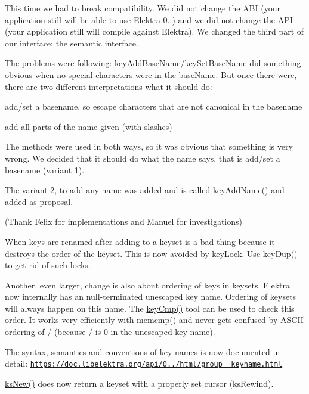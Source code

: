 This time we had to break compatibility. We did not change the A\+BI (your application still will be able to use Elektra 0..) and we did not change the A\+PI (your application still will compile against Elektra). We changed the third part of our interface\+: the semantic interface.

The problems were following\+: key\+Add\+Base\+Name/key\+Set\+Base\+Name did something obvious when no special characters were in the base\+Name. But once there were, there are two different interpretations what it should do\+:


\begin{DoxyEnumerate}
\item add/set a basename, so escape characters that are not canonical in the basename
\item add all parts of the name given (with slashes)
\end{DoxyEnumerate}

The methods were used in both ways, so it was obvious that something is very wrong. We decided that it should do what the name says, that is add/set a basename (variant 1).

The variant 2, to add any name was added and is called \hyperlink{group__keyname_gaa70593a2c772c4b7bc33423b9b10a270}{key\+Add\+Name()} and added as proposal.

(Thank Felix for implementations and Manuel for investigations)

When keys are renamed after adding to a keyset is a bad thing because it destroys the order of the keyset. This is now avoided by key\+Lock. Use \hyperlink{group__key_gae6ec6a60cc4b8c1463fa08623d056ce3}{key\+Dup()} to get rid of such locks.

Another, even larger, change is also about ordering of keys in keysets. Elektra now internally has an null-\/terminated unescaped key name. Ordering of keysets will always happen on this name. The {\ttfamily \hyperlink{group__keytest_gaf6e66e12fe04d535a5d1c8218ced803e}{key\+Cmp()}} tool can be used to check this order. It works very efficiently with {\ttfamily memcmp()} and never gets confused by A\+S\+C\+II ordering of / (because / is 0 in the unescaped key name).

The syntax, semantics and conventions of key names is now documented in detail\+: \href{https://doc.libelektra.org/api/0.8.8/html/group__keyname.html}{\tt https\+://doc.\+libelektra.\+org/api/0../html/group\+\_\+\+\_\+keyname.\+html}

\hyperlink{group__keyset_ga671e1aaee3ae9dc13b4834a4ddbd2c3c}{ks\+New()} does now return a keyset with a properly set cursor (ks\+Rewind).

